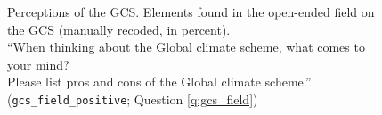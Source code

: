 \begin{figure}[h!]
    \cprotect\caption[Classification of open-ended field on the GCS]{Perceptions of the GCS. Elements found in the open-ended field on the GCS (manually recoded, in percent). \\ ``When thinking about the Global climate scheme, what comes to
    your mind?
    \\ Please list pros and cons of the Global climate scheme.'' (\verb|gcs_field_positive|; Question \ref{q:gcs_field}) %
    }\label{fig:gcs_field}
\end{figure}

